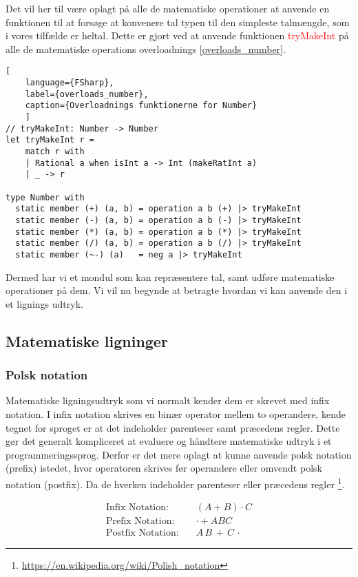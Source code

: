 \documentclass{article}
\begin{document}
Det vil her til være oplagt på alle de matematiske operationer at anvende en funktionen til at forsøge at konvenere tal typen til den simpleste talmængde, som i vores tilfælde er heltal. Dette er gjort ved at anvende funktionen \textcolor{red}{tryMakeInt} på alle de matematiske operations overloadnings \ref{overloads_number}.

\begin{lstlisting}[
    language={FSharp},
    label={overloads_number}, 
    caption={Overloadnings funktionerne for Number}
    ]
// tryMakeInt: Number -> Number
let tryMakeInt r =
    match r with
    | Rational a when isInt a -> Int (makeRatInt a)
    | _ -> r
    
type Number with
  static member (+) (a, b) = operation a b (+) |> tryMakeInt
  static member (-) (a, b) = operation a b (-) |> tryMakeInt
  static member (*) (a, b) = operation a b (*) |> tryMakeInt
  static member (/) (a, b) = operation a b (/) |> tryMakeInt
  static member (~-) (a)   = neg a |> tryMakeInt
\end{lstlisting}

Dermed har vi et mondul som kan repræsentere tal, samt udføre matematiske operationer på dem. Vi vil nu begynde at betragte hvordan vi kan anvende den i et lignings udtryk.

\subsection{Matematiske ligninger}
\subsubsection{Polsk notation}
Matematiske ligningsudtryk som vi normalt kender dem er skrevet med infix notation. I infix notation skrives en binær operator mellem to operandere, kende tegnet for sproget er at det indeholder parenteser samt præcedens regler. Dette gør det generalt kompliceret at evaluere og håndtere matematiske udtryk i et programmeringssprog. Derfor er det mere oplagt at kunne anvende polsk notation (prefix) istedet, hvor operatoren skrives før operandere eller omvendt polsk notation (postfix). Da de hverken indeholder parenteser eller præcedens regler \footnote{\url{https://en.wikipedia.org/wiki/Polish_notation}}. 

\begin{align*}
    \text{Infix Notation:} \quad & (A + B) \cdot C \\
    \text{Prefix Notation:} \quad &  \cdot + A B C  \\
    \text{Postfix Notation:} \quad & A \, B \, + \, C \, \cdot
\end{align*}
\end{document}
